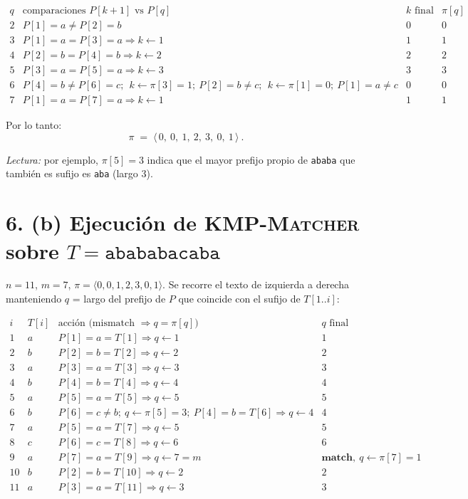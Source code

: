\documentclass[11pt]{article}
\begin{document}
\[
\begin{array}{c|c|c|c}
q & \text{comparaciones } P[k+1] \text{ vs } P[q] & k\text{ final} & \pi[q]\\\hline
2 & P[1]{=}a \neq P[2]{=}b & 0 & 0\\
3 & P[1]{=}a = P[3]{=}a \Rightarrow k\gets 1 & 1 & 1\\
4 & P[2]{=}b = P[4]{=}b \Rightarrow k\gets 2 & 2 & 2\\
5 & P[3]{=}a = P[5]{=}a \Rightarrow k\gets 3 & 3 & 3\\
6 & P[4]{=}b \neq P[6]{=}c;\ \ k\gets \pi[3]{=}1;\ P[2]{=}b\neq c;\ \ k\gets \pi[1]{=}0;\ P[1]{=}a\neq c & 0 & 0\\
7 & P[1]{=}a = P[7]{=}a \Rightarrow k\gets 1 & 1 & 1
\end{array}
\]

Por lo tanto:
\[
\boxed{\ \pi \;=\; \langle\,0,\ 0,\ 1,\ 2,\ 3,\ 0,\ 1\,\rangle\ }.
\]

\emph{Lectura:} por ejemplo, \(\pi[5]=3\) indica que el mayor prefijo propio de \texttt{ababa} que también es sufijo es \texttt{aba} (largo \(3\)).

\section*{6. (b) Ejecución de \textsc{KMP-Matcher} sobre \(T=\texttt{abababacaba}\)}

\(n=11\), \(m=7\), \(\pi=\langle0,0,1,2,3,0,1\rangle\). Se recorre el texto de izquierda a derecha manteniendo \(q\) = largo del prefijo de \(P\) que coincide con el sufijo de \(T[1..i]\):

\[
\begin{array}{c|c|c|c}
i & T[i] & \text{acción (mismatch }\Rightarrow q=\pi[q]\text{)} & q \text{ final}\\\hline
1 & a & P[1]{=}a = T[1] \Rightarrow q\gets 1 & 1\\
2 & b & P[2]{=}b = T[2] \Rightarrow q\gets 2 & 2\\
3 & a & P[3]{=}a = T[3] \Rightarrow q\gets 3 & 3\\
4 & b & P[4]{=}b = T[4] \Rightarrow q\gets 4 & 4\\
5 & a & P[5]{=}a = T[5] \Rightarrow q\gets 5 & 5\\
6 & b & P[6]{=}c \neq b;\ q\gets\pi[5]{=}3;\ P[4]{=}b=T[6]\Rightarrow q\gets 4 & 4\\
7 & a & P[5]{=}a = T[7] \Rightarrow q\gets 5 & 5\\
8 & c & P[6]{=}c = T[8] \Rightarrow q\gets 6 & 6\\
9 & a & P[7]{=}a = T[9] \Rightarrow q\gets 7 = m & \textbf{match},\ q\gets\pi[7]{=}1\\
10 & b & P[2]{=}b = T[10] \Rightarrow q\gets 2 & 2\\
11 & a & P[3]{=}a = T[11] \Rightarrow q\gets 3 & 3
\end{array}
\]
\end{document}
